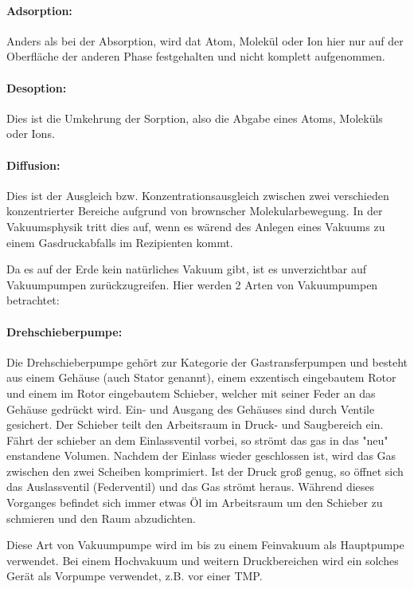 \paragraph{Adsorption:}
Anders als bei der Absorption, wird dat Atom, Molekül oder Ion hier nur auf der Oberfläche der anderen Phase
festgehalten und nicht komplett aufgenommen.

\paragraph{Desoption:}
Dies ist die Umkehrung der Sorption, also die Abgabe eines Atoms, Moleküls oder Ions.

 \paragraph{Diffusion:}
 Dies ist der Ausgleich bzw. Konzentrationsausgleich zwischen zwei verschieden konzentrierter Bereiche
 aufgrund von brownscher Molekularbewegung. In der Vakuumsphysik tritt dies auf, wenn es wärend des Anlegen eines
 Vakuums zu einem Gasdruckabfalls im Rezipienten kommt.

 Da es auf der Erde kein natürliches Vakuum gibt, ist es unverzichtbar auf Vakuumpumpen zurückzugreifen. Hier werden
 2 Arten von Vakuumpumpen betrachtet:

 \paragraph{Drehschieberpumpe:}
 Die Drehschieberpumpe gehört zur Kategorie der Gastransferpumpen und besteht aus einem Gehäuse (auch Stator genannt), einem
 exzentisch eingebautem Rotor und einem im Rotor eingebautem Schieber, welcher mit seiner Feder an das Gehäuse gedrückt wird.
 Ein- und Ausgang des Gehäuses sind durch Ventile gesichert.
 Der Schieber teilt den Arbeitsraum in Druck- und Saugbereich ein. Fährt der schieber an dem Einlassventil vorbei, so strömt
 das gas in das "neu" enstandene Volumen. Nachdem der Einlass wieder geschlossen ist, wird das Gas zwischen den zwei Scheiben komprimiert.
 Ist der Druck groß genug, so öffnet sich das Auslassventil (Federventil) und das Gas strömt heraus. Während dieses Vorganges
 befindet sich immer etwas Öl im Arbeitsraum um den Schieber zu schmieren und den Raum abzudichten.

 Diese Art von Vakuumpumpe wird im bis zu einem Feinvakuum als Hauptpumpe verwendet. Bei einem Hochvakuum und weitern Druckbereichen wird
 ein solches Gerät als Vorpumpe verwendet, z.B. vor einer TMP.

